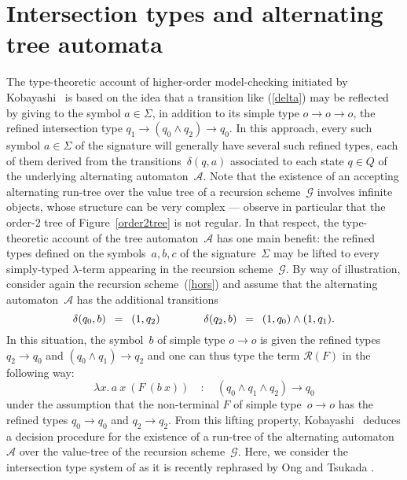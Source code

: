 \documentclass{eptcs}
\begin{document}
\section{Intersection types and alternating tree automata}
\label{section/intersection-types}
The type-theoretic account of higher-order model-checking initiated by Kobayashi~\cite{koba09} 
is based on the idea that a transition like (\ref{delta}) may be reflected
by giving to the symbol $a\in\Sigma$, in addition to its simple type $o \rightarrow o \rightarrow o$, 
the refined intersection type $q_1 \rightarrow (q_0 \wedge q_2) \rightarrow q_0$. 
In this approach, every such symbol $a\in\Sigma$ of the signature
will generally have several such refined types, each of them
derived from the transitions~$\delta(q,a)$ associated to each state $q\in Q$ of the underlying
alternating automaton~$\mathcal{A}$.
Note that the existence of an accepting alternating run-tree over the value tree of a recursion scheme~$\mathcal{G}$
involves infinite objects, whose structure can be very complex ---
observe in particular that the order-$2$ tree of Figure~\ref{order2tree} is not regular.
In that respect, the type-theoretic account of the tree automaton~$\mathcal{A}$ has one main benefit:
the refined types defined on the symbols~$a,b,c$ of the signature~$\Sigma$ may be lifted
to every simply-typed $\lambda$-term appearing in the recursion scheme~$\mathcal{G}$.
By way of illustration, consider again the recursion scheme~(\ref{hors}) and assume
that the alternating automaton~$\mathcal{A}$ has the additional transitions
$$
\delta(q_0,b) \hspace{.5em} =  \hspace{.5em} (1,q_2)
\quad\quad\quad\quad
\delta(q_2,b)  \hspace{.5em} =  \hspace{.5em} (1,q_0)\wedge(1,q_1).
$$
In this situation, the symbol~$b$ of simple type $o\to o$ is given
the refined types $q_2 \rightarrow q_0$ and $(q_0 \wedge q_1) \rightarrow q_2$
and one can thus type the term $\mathcal{R}(F)$ in the following way:
$$
\lambda x.\, a\ x\ (F\ (b\ x))\quad : \quad (q_0 \wedge q_1 \wedge q_2) \rightarrow q_0
$$
under the assumption that the non-terminal $F$ of simple type~$o\to o$
has the refined types $q_0 \rightarrow q_0$ and $q_2 \rightarrow q_2$.
From this lifting property, Kobayashi~\cite{koba09} deduces a decision procedure for the existence 
of a run-tree of the alternating automaton~$\mathcal{A}$ over the value-tree of the recursion scheme~$\mathcal{G}$.
Here, we consider the intersection type system of \cite{koba09} as it is recently rephrased by Ong and Tsukada \cite{ong-tsukada}.
\end{document}
